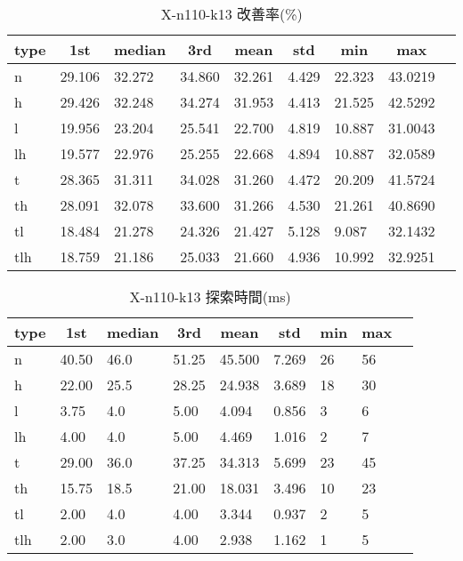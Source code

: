 \begin{table}[htbp]
    \caption{X-n110-k13 改善率(\%)}
    \begin{tabular}{|l|l|l|l|l|l|l|l|l|}\hline
    \multicolumn{1}{|c|}{\textbf{type}}
    &\multicolumn{1}{|c|}{\textbf{1st}}
    &\multicolumn{1}{c|}{\textbf{median}}
    &\multicolumn{1}{c|}{\textbf{3rd}}
    &\multicolumn{1}{c|}{\textbf{mean}}
    &\multicolumn{1}{c|}{\textbf{std}}
    &\multicolumn{1}{c|}{\textbf{min}}
    &\multicolumn{1}{c|}{\textbf{max}}\\\hline
	n & 29.106 & 32.272 & 34.860 & 32.261 & 4.429 & 22.323 & 43.0219\\\hline
	h & 29.426 & 32.248 & 34.274 & 31.953 & 4.413 & 21.525 & 42.5292\\\hline
	l & 19.956 & 23.204 & 25.541 & 22.700 & 4.819 & 10.887 & 31.0043\\\hline
	lh & 19.577 & 22.976 & 25.255 & 22.668 & 4.894 & 10.887 & 32.0589\\\hline
	t & 28.365 & 31.311 & 34.028 & 31.260 & 4.472 & 20.209 & 41.5724\\\hline
	th & 28.091 & 32.078 & 33.600 & 31.266 & 4.530 & 21.261 & 40.8690\\\hline
	tl & 18.484 & 21.278 & 24.326 & 21.427 & 5.128 & 9.087 & 32.1432\\\hline
	tlh & 18.759 & 21.186 & 25.033 & 21.660 & 4.936 & 10.992 & 32.9251\\\hline
	\end{tabular}
\end{table}
\begin{table}[htbp]
    \caption{X-n110-k13 探索時間(ms)}
    \begin{tabular}{|l|l|l|l|l|l|l|l|l|}\hline
    \multicolumn{1}{|c|}{\textbf{type}}
    &\multicolumn{1}{|c|}{\textbf{1st}}
    &\multicolumn{1}{c|}{\textbf{median}}
    &\multicolumn{1}{c|}{\textbf{3rd}}
    &\multicolumn{1}{c|}{\textbf{mean}}
    &\multicolumn{1}{c|}{\textbf{std}}
    &\multicolumn{1}{c|}{\textbf{min}}
    &\multicolumn{1}{c|}{\textbf{max}}\\\hline
	n & 40.50 & 46.0 & 51.25 & 45.500 & 7.269 & 26 & 56\\\hline
	h & 22.00 & 25.5 & 28.25 & 24.938 & 3.689 & 18 & 30\\\hline
	l & 3.75 & 4.0 & 5.00 & 4.094 & 0.856 & 3 & 6\\\hline
	lh & 4.00 & 4.0 & 5.00 & 4.469 & 1.016 & 2 & 7\\\hline
	t & 29.00 & 36.0 & 37.25 & 34.313 & 5.699 & 23 & 45\\\hline
	th & 15.75 & 18.5 & 21.00 & 18.031 & 3.496 & 10 & 23\\\hline
	tl & 2.00 & 4.0 & 4.00 & 3.344 & 0.937 & 2 & 5\\\hline
	tlh & 2.00 & 3.0 & 4.00 & 2.938 & 1.162 & 1 & 5\\\hline
	\end{tabular}
\end{table}
